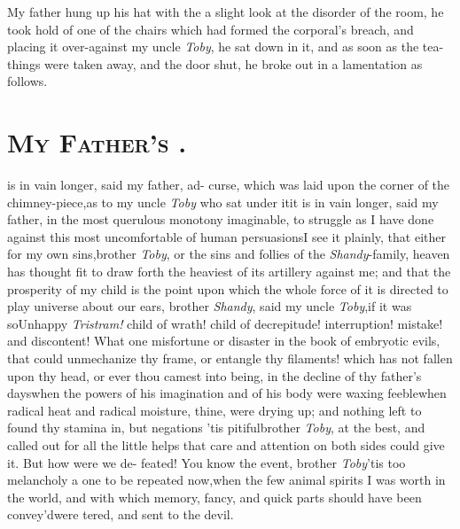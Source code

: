 \documentclass[twoside]{article}
\begin{document}
My father hung up his hat with the  a slight look at the disorder of the room, he took
hold of one of the chairs which had formed the corporal’s
breach, and placing it over-against my uncle \textit{Toby}, he sat
down in it, and as soon as the tea-things were taken away, and the
door shut, he broke out in a lamentation as follows.

\section{\textsc{My Father's }.}

 is in vain longer, said my father,
ad-\break{}
curse, which was laid upon the corner of the chimney-piece,\tsk as
to my uncle \textit{Toby} who sat under it\tsk it is in vain
longer,
said my father, in the most querulous monotony imaginable,
to struggle as I have done against this most uncomfortable
of human persuasions\tsk I see it plainly, that either for
my own sins,\break brother \textit{Toby}, or the sins and follies
of the \textit{Shandy}-family, heaven has thought fit to
draw forth the heaviest of its artillery against me; and
that the prosperity of my child is the point upon which the
whole force of it is directed to play\tsh\break
{} universe about our ears,
brother \textit{Shandy}, said my uncle \textit{Toby},\tsk if
it was so\tsk Unhappy \textit{Tristram!} child of wrath!
child of decrepitude!  interruption! mistake! and
discontent! What one misfortune or disaster in the book of
embryotic evils, that could unmechanize thy frame, or
entangle thy filaments!  which has not fallen upon thy head,
or ever thou camest
into being, in the decline of thy father’s days\tsk when the
powers of his imagination and of his body were waxing
feeble\tsk when radical heat and radical moisture, 
 thine, were drying up;
and nothing left to found thy stamina in, but
negations\tsk\break\enlargethispage\baselineskip
\tsk ’tis pitiful\tsk brother \textit{Toby}, at the best,\break
and called out for all the little helps\break 
that care and attention on both sides\break 
could give it. But how were we de-\break
feated! You know the event, brother\break
\textit{Toby}\tsk ’tis too melancholy a one to be\break
repeated now,\tsk when the few animal\break
spirits I was worth in the world, and\break
with which memory, fancy, and quick\break
parts should have been convey’d\tsk were\break
{}
tered, and sent to the devil.\tsk{}
\end{document}
